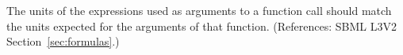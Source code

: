 The units of the expressions used as arguments to a function call
should match the units expected for the arguments of that function.
(References: SBML L3V2 Section~\ref{sec:formulas}.)
